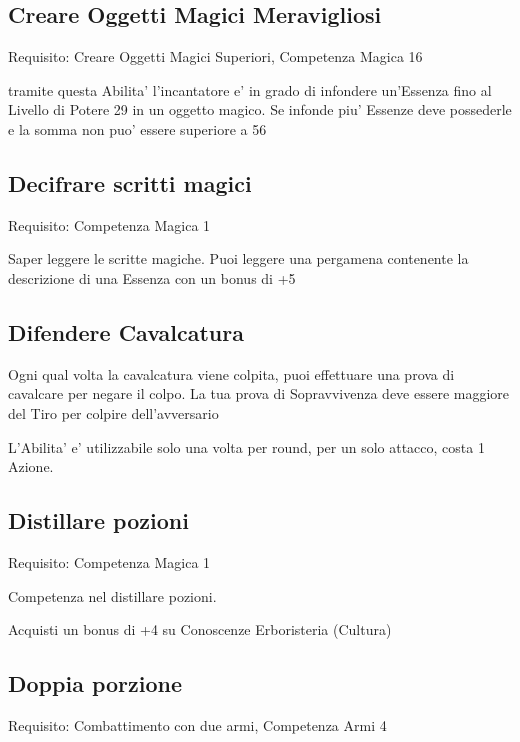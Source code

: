 \documentclass[a4paper,11pt,twoside,openany]{book}
\begin{document}
	\subsection{Creare Oggetti Magici Meravigliosi}
	
	Requisito: Creare Oggetti Magici Superiori, Competenza Magica 16
	
	tramite questa Abilita' l'incantatore e' in grado di infondere un'Essenza fino al Livello di Potere 29 in un oggetto magico. Se infonde piu' Essenze deve possederle e la somma non puo' essere superiore a 56
	
	\subsection{Decifrare scritti magici}
	
	Requisito: Competenza Magica 1
	
	Saper leggere le scritte magiche. Puoi leggere una pergamena contenente la descrizione di una Essenza con un bonus di +5
	
	\subsection{Difendere Cavalcatura}
	
	Ogni qual volta la cavalcatura viene colpita, puoi effettuare una prova di cavalcare per negare il colpo. La tua prova di Sopravvivenza deve essere maggiore del Tiro per colpire dell'avversario
	
	L'Abilita' e' utilizzabile solo una volta per round, per un solo attacco, costa 1 Azione.
	
	\subsection{Distillare pozioni}
	
	Requisito: Competenza Magica 1
	
	Competenza nel distillare pozioni.
	
	Acquisti un bonus di +4 su Conoscenze Erboristeria (Cultura)
	
	\subsection{Doppia porzione}
	
	Requisito: Combattimento con due armi, Competenza Armi 4
	
\end{document}
